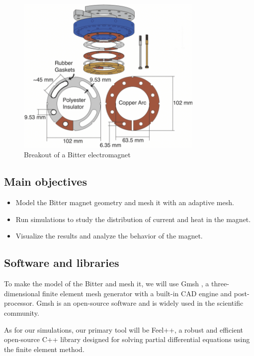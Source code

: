 \documentclass[12pt]{article}
\begin{document}
\begin{figure}[H]
  \centering
  \includegraphics[width=0.8\textwidth]{images/Bitter-electromagnet-breakout.png}
  \caption{Breakout of a Bitter electromagnet \cite{bitter_breakout}}
\end{figure}

\subsection{Main objectives}

\begin{itemize}
  \item Model the Bitter magnet geometry and mesh it with an adaptive mesh.
  \item Run simulations to study the distribution of current and heat in the magnet.
  \item Visualize the results and analyze the behavior of the magnet.
\end{itemize}

\subsection{Software and libraries}
To make the model of the Bitter and mesh it, we will use Gmsh \cite{geuzaine_gmsh_2009}, a three-dimensional
finite element mesh generator with a built-in CAD engine and post-processor.
Gmsh is an open-source software and is widely used in the scientific
community.

As for our simulations, our primary tool will be Feel++\cite{christophe_prudhomme_feelppfeelpp_2024}, a robust and
efficient open-source C++ library designed for solving partial differential equations using
the finite element method\cite{fem}.
\end{document}
